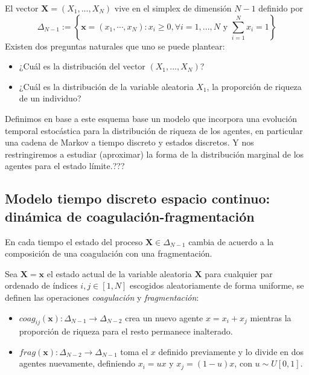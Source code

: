 \documentclass[10pt]{article}
\theoremstyle{plain}
\theoremstyle{definition}
\begin{document}
El vector $\mathbf{X} = \left( X_{1},...,X_{N} \right)$ vive en el simplex de dimensión $N-1$ definido por
\[
    \Delta_{N-1} := \left\{ \mathbf{x} = (x_{1},\cdots, x_{N}): x_{i}\geq 0,\forall i=1,...,N \text{ y }\sum\limits_{i=1}^{N}x_{i} = 1 \right\}
\]
Existen dos preguntas naturales que uno se puede plantear:
\begin{itemize}
    \item ¿Cuál es la distribución del vector $(X_{1},...,X_{N})$?
    \item ¿Cuál es la distribución de la variable aleatoria $X_{1} $, la proporción de riqueza de un individuo?
\end{itemize}

Definimos en base a este esquema base un modelo que incorpora una evolución temporal estocástica para la distribución de riqueza de los agentes, en particular una cadena de Markov a tiempo discreto y estados discretos. Y nos restringiremos a estudiar (aproximar) la forma de la distribución marginal de los agentes para el estado límite.???

\subsection{Modelo tiempo discreto espacio continuo: dinámica de coagulación-fragmentación}

En cada tiempo el estado del proceso $\mathbf{X}\in \Delta_{N-1}$ cambia de acuerdo a la composición de una coagulación con una fragmentación.

Sea $\mathbf{X} = \mathbf{x}$ el estado actual de la variable aleatoria $\mathbf{X}$ para cualquier par ordenado de índices $ i,j \in [1,N]$ escogidos aleatoriamente de forma uniforme, se definen las operaciones {\sl coagulación} y {\sl fragmentación}:
\begin{itemize}
    \item $coag_{ij}(\mathbf{x}): \Delta_{N-1} \rightarrow \Delta_{N-2}$  crea un nuevo agente $x= x_{i}+x_{j}$ mientras la proporción de riqueza para el resto permanece inalterado. %
    \item $frag(\mathbf{x}): \Delta_{N-2} \rightarrow \Delta_{N-1}$ toma el $x$ definido previamente y  lo divide en dos agentes  nuevamente, definiendo $x_{i} = ux$ y $x_{j} = (1-u)x$, con $u\sim U[0,1]$. %
\end{itemize}
\end{document}
